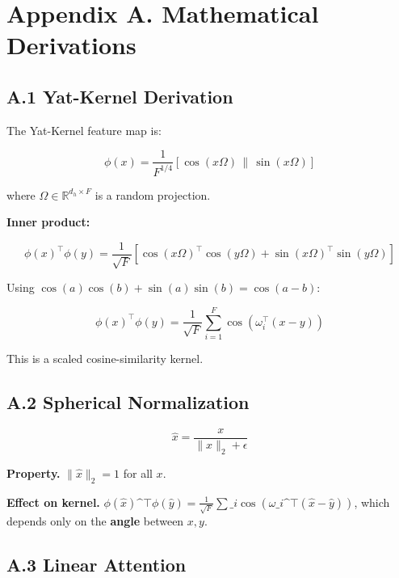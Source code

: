 \section{Appendix A. Mathematical Derivations}

\subsection{A.1 Yat-Kernel Derivation}

The Yat-Kernel feature map is:

\begin{equation}
\phi(x) = \frac{1}{F^{1/4}} [\cos(x \Omega) \,\|\, \sin(x \Omega)]
\end{equation}

where $\Omega \in \mathbb{R}^{d_h \times F}$ is a random projection.

\textbf{Inner product:}

\begin{equation}
\phi(x)^\top \phi(y) = \frac{1}{\sqrt{F}} [\cos(x\Omega)^\top \cos(y\Omega) 
+ \sin(x\Omega)^\top \sin(y\Omega)]
\end{equation}

Using $\cos(a)\cos(b) + \sin(a)\sin(b) = \cos(a - b)$:

\begin{equation}
\phi(x)^\top \phi(y) = \frac{1}{\sqrt{F}} \sum_{i=1}^{F} \cos(\omega_i^\top (x - y))
\end{equation}

This is a scaled cosine-similarity kernel.

\subsection{A.2 Spherical Normalization}

\begin{equation}
\hat{x} = \frac{x}{\|x\|_2 + \epsilon}
\end{equation}

\textbf{Property.} $\|\hat{x}\|_2 = 1$ for all $x$.

\textbf{Effect on kernel.} $\phi(\hat{x})\^{}\top \phi(\hat{y}) = \frac{1}{\sqrt{F}} 
\sum\_i \cos(\omega\_i\^{}\top (\hat{x} - \hat{y}))$, which depends only on the 
\textbf{angle} between $x, y$.

\subsection{A.3 Linear Attention}

